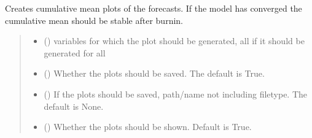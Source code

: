 \documentclass[letterpaper,10pt,english]{sphinxmanual}
\begin{document}
\begin{fulllineitems}
\begin{fulllineitems}
\label{\detokenize{MUFBVAR:MUFBVAR.mufbvar.multifrequency_var.mean_plot}}
\pysigstartsignatures
{}
\pysigstopsignatures
\sphinxAtStartPar
Creates cumulative mean plots of the forecasts. If the model has converged the cumulative mean should be stable after burnin.
\begin{quote}\begin{description}
\begin{itemize}
\item {} 
\sphinxAtStartPar
{} () \textendash{} variables for which the plot should be generated, all if it should be generated for all

\item {} 
\sphinxAtStartPar
{} () \textendash{} Whether the plots should be saved. The default is True.

\item {} 
\sphinxAtStartPar
{} (\sphinxstyleliteralemphasis{\sphinxupquote{, }}) \textendash{} If the plots should be saved, path/name not including filetype. The default is None.

\item {} 
\sphinxAtStartPar
{} () \textendash{} Whether the plots should be shown. Default is True.

\end{itemize}

\end{description}\end{quote}


\end{fulllineitems}
\end{fulllineitems}
\end{document}

